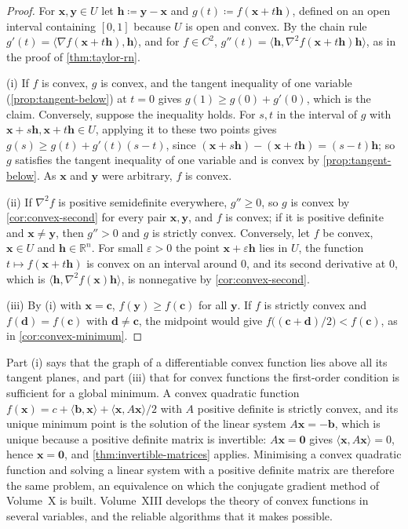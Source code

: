 \begin{proof}
For $\mathbf x,\mathbf y\in U$ let $\mathbf h\coloneqq\mathbf y-\mathbf x$ and $g(t)\coloneqq f(\mathbf x+t\mathbf h)$, defined on an open interval containing $[0,1]$ because $U$ is open and convex. By the chain rule $g'(t)=\langle\nabla f(\mathbf x+t\mathbf h),\mathbf h\rangle$, and for $f\in C^2$, $g''(t)=\langle\mathbf h,\nabla^2f(\mathbf x+t\mathbf h)\mathbf h\rangle$, as in the proof of \cref{thm:taylor-rn}.

(i) If $f$ is convex, $g$ is convex, and the tangent inequality of one variable (\cref{prop:tangent-below}) at $t=0$ gives $g(1)\ge g(0)+g'(0)$, which is the claim. Conversely, suppose the inequality holds. For $s,t$ in the interval of $g$ with $\mathbf x+s\mathbf h,\mathbf x+t\mathbf h\in U$, applying it to these two points gives $g(s)\ge g(t)+g'(t)(s-t)$, since $(\mathbf x+s\mathbf h)-(\mathbf x+t\mathbf h)=(s-t)\mathbf h$; so $g$ satisfies the tangent inequality of one variable and is convex by \cref{prop:tangent-below}. As $\mathbf x$ and $\mathbf y$ were arbitrary, $f$ is convex.

(ii) If $\nabla^2f$ is positive semidefinite everywhere, $g''\ge0$, so $g$ is convex by \cref{cor:convex-second} for every pair $\mathbf x,\mathbf y$, and $f$ is convex; if it is positive definite and $\mathbf x\ne\mathbf y$, then $g''>0$ and $g$ is strictly convex. Conversely, let $f$ be convex, $\mathbf x\in U$ and $\mathbf h\in\mathbb R^n$. For small $\varepsilon>0$ the point $\mathbf x+\varepsilon\mathbf h$ lies in $U$, the function $t\mapsto f(\mathbf x+t\mathbf h)$ is convex on an interval around $0$, and its second derivative at $0$, which is $\langle\mathbf h,\nabla^2f(\mathbf x)\mathbf h\rangle$, is nonnegative by \cref{cor:convex-second}.

(iii) By (i) with $\mathbf x=\mathbf c$, $f(\mathbf y)\ge f(\mathbf c)$ for all $\mathbf y$. If $f$ is strictly convex and $f(\mathbf d)=f(\mathbf c)$ with $\mathbf d\ne\mathbf c$, the midpoint would give $f\bigl((\mathbf c+\mathbf d)/2\bigr)<f(\mathbf c)$, as in \cref{cor:convex-minimum}.
\end{proof}

Part (i) says that the graph of a differentiable convex function lies above all its tangent planes, and part (iii) that for convex functions the first-order condition is sufficient for a global minimum. A convex quadratic function $f(\mathbf x)=c+\langle\mathbf b,\mathbf x\rangle+\langle\mathbf x,A\mathbf x\rangle/2$ with $A$ positive definite is strictly convex, and its unique minimum point is the solution of the linear system $A\mathbf x=-\mathbf b$, which is unique because a positive definite matrix is invertible: $A\mathbf x=\mathbf0$ gives $\langle\mathbf x,A\mathbf x\rangle=0$, hence $\mathbf x=\mathbf0$, and \cref{thm:invertible-matrices} applies. Minimising a convex quadratic function and solving a linear system with a positive definite matrix are therefore the same problem, an equivalence on which the conjugate gradient method of Volume~X is built. Volume~XIII develops the theory of convex functions in several variables, and the reliable algorithms that it makes possible.

